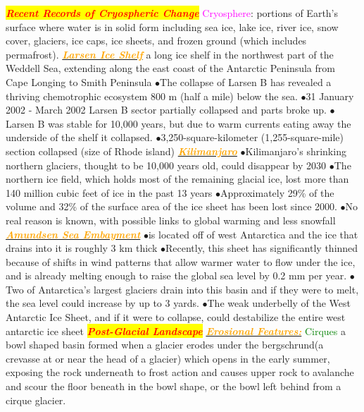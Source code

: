 \documentclass{article}
\newcommand{\ddd}{$\bullet$}
\newcommand{\red}[1]{\textcolor{red}{#1}}
\newcommand{\green}[1]{\textcolor{green}{#1}}
\newcommand{\pink}[1]{\textcolor{magenta}{#1}}
\newcommand{\orange}[1]{\textcolor{orange}{#1}}
\newcommand{\mysection}[1]{\colorbox{yellow}{{\textbf{\textbf{\textit{\red{#1}}}}}}}
\newcommand{\mysub}[1]{\underline{\textbf{{\textit{\orange{#1}}}}}}
\newcommand{\mysubsub}[1]{{{\green{#1}}}}
\newcommand{\vocab}[1]{{\pink{#1}}}
\begin{document}
\begin{multicols*}{4}
        \mysection{Recent Records of Cryospheric Change}
            \vocab{Cryosphere}: portions of Earth’s surface where water is in solid form including sea ice, lake ice, river ice, snow cover, glaciers, ice caps, ice sheets, and frozen ground (which includes permafrost).
            \mysub{Larsen Ice Shelf}
                a long ice shelf in the northwest part of the Weddell Sea, extending along the east coast of the Antarctic Peninsula from Cape Longing to Smith Peninsula
                \ddd The collapse of Larsen B has revealed a thriving chemotrophic ecosystem 800 m (half a mile) below the sea.
                \ddd 31 January 2002 - March 2002 Larsen B sector partially collapsed and parts broke up. 
                \ddd Larsen B was stable for 10,000 years, but due to warm currents eating away the underside of the shelf it collapsed. 
                \ddd 3,250-square-kilometer (1,255-square-mile) section collapsed (size of Rhode island)
            \mysub{Kilimanjaro}
                \ddd Kilimanjaro's shrinking northern glaciers, thought to be 10,000 years old, could disappear by 2030
                \ddd The northern ice field, which holds most of the remaining glacial ice, lost more than 140 million cubic feet of ice in the past 13 years
                \ddd Approximately 29\% of the volume and 32\% of the surface area of the ice sheet has been lost since 2000.
                \ddd No real reason is known, with possible links to global warming and less snowfall
            \mysub{Amundsen Sea Embayment}
                \ddd is located off of west Antarctica and the ice that drains into it is roughly 3 km thick
                \ddd Recently, this sheet has significantly thinned because of shifts in wind patterns that allow warmer water to flow under the ice, and is already melting enough to raise the global sea level by 0.2 mm per year. 
                \ddd Two of Antarctica's largest glaciers drain into this basin and if they were to melt, the sea level could increase by up to 3 yards. 
                \ddd The weak underbelly of the West Antarctic Ice Sheet, and if it were to collapse, could destabilize the entire west antarctic ice sheet
 	    \mysection{Post-Glacial Landscape}  
	 	    \mysub{Erosional Features:}
	 	    \mysubsub{Cirques} a bowl shaped basin formed when a glacier erodes under the bergschrund(a crevasse at or near the head of a glacier) which opens in the early summer, exposing the rock underneath to frost action and causes upper rock to avalanche and scour the floor beneath in the bowl shape, or the bowl left behind from a cirque glacier.

\end{multicols*}
\end{document}
